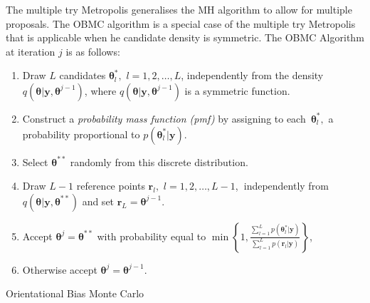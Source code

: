 \documentclass[article]{jss}
\begin{document}
The multiple try Metropolis \citep{LuiLiangWong2000} generalises the
MH algorithm to allow for multiple proposals. The OBMC algorithm is a
special case of the multiple try Metropolis that is applicable when he
candidate density is symmetric. The OBMC Algorithm at iteration $j$ is
as follows:

%
\begin{algorithm}[H]
\begin{enumerate}
\item Draw $L$ candidates $\bm{\theta}_{l}^{\ast},$ $l=1,2,\ldots,L$,
  independently from the density
  $q\left(\bm{\theta}|\bm{y},\bm{\theta}^{j-1}\right)$, where
  $q\left(\bm{\theta}|\bm{y},\bm{\theta}^{j-1}\right)$ is a symmetric
  function.
\item Construct a \textit{probability mass function (pmf)} by
  assigning to each\emph{\ }$\bm{\theta}_{l}^{\ast},$ a probability
  proportional to $p\left(\bm{\theta}_{l}^{\ast}|\bm{y}\right).$
\item Select $\bm{\theta}^{\ast\ast}$ randomly from this discrete
  distribution.
\item Draw $L-1$ reference points $\bm{r}_{l},$
  $l=1,2,\ldots,L-1$,\textbf{\ }independently from
  $q\left(\bm{\theta}|\bm{y},\bm{\theta}^{\ast\ast}\right)$ and set
  $\bm{r}_{L}=\bm{\theta}^{j-1}.$
\item Accept $\bm{\theta}^{j}=\bm{\theta}^{\ast\ast}$ with probability
  equal to $\min\left\{
    1,\frac{\sum_{l=1}^{L}p\left(\bm{\theta}_{l}^{\ast}|\bm{y}\right)}{\sum_{l=1}^{L}p\left(\bm{r}_{l}|\bm{y}\right)}\right\}
  $,
\item Otherwise accept $\bm{\theta}^{j}=\bm{\theta}^{j-1}.$
\end{enumerate}
\caption{Orientational Bias Monte Carlo}
\label{alg:obmc}
\end{algorithm}
\end{document}
